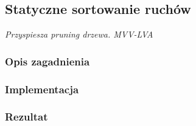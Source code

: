 \subsection{Statyczne sortowanie ruchów}
\label{subsec:sortowanie-ruchow}
\textit{Przyspiesza pruning drzewa. MVV-LVA}


\subsubsection{Opis zagadnienia}
\subsubsection{Implementacja}
\subsubsection{Rezultat}